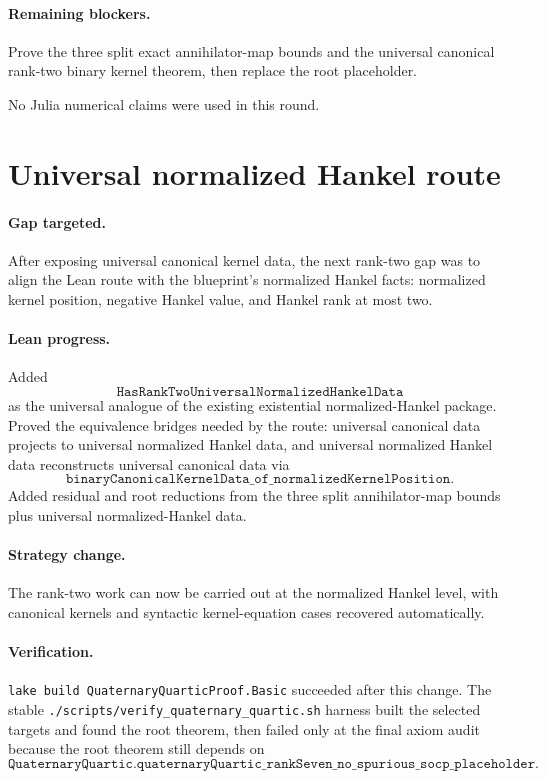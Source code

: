 \documentclass[11pt]{article}
\begin{document}
\paragraph{Remaining blockers.}
Prove the three split exact annihilator-map bounds and the universal canonical
rank-two binary kernel theorem, then replace the root placeholder.

No Julia numerical claims were used in this round.

\section*{Universal normalized Hankel route}

\paragraph{Gap targeted.}
After exposing universal canonical kernel data, the next rank-two gap was to
align the Lean route with the blueprint's normalized Hankel facts: normalized
kernel position, negative Hankel value, and Hankel rank at most two.

\paragraph{Lean progress.}
Added
\[
\texttt{HasRankTwoUniversalNormalizedHankelData}
\]
as the universal analogue of the existing existential normalized-Hankel
package.  Proved the equivalence bridges needed by the route:
universal canonical data projects to universal normalized Hankel data, and
universal normalized Hankel data reconstructs universal canonical data via
\[
\texttt{binaryCanonicalKernelData\_of\_normalizedKernelPosition}.
\]
Added residual and root reductions from the three split annihilator-map bounds
plus universal normalized-Hankel data.

\paragraph{Strategy change.}
The rank-two work can now be carried out at the normalized Hankel level, with
canonical kernels and syntactic kernel-equation cases recovered automatically.

\paragraph{Verification.}
\texttt{lake build QuaternaryQuarticProof.Basic} succeeded after this change.
The stable \texttt{./scripts/verify\_quaternary\_quartic.sh} harness built the
selected targets and found the root theorem, then failed only at the final axiom
audit because the root theorem still depends on
\[
\texttt{QuaternaryQuartic.quaternaryQuartic\_rankSeven\_no\_spurious\_socp\_placeholder}.
\]
\end{document}
